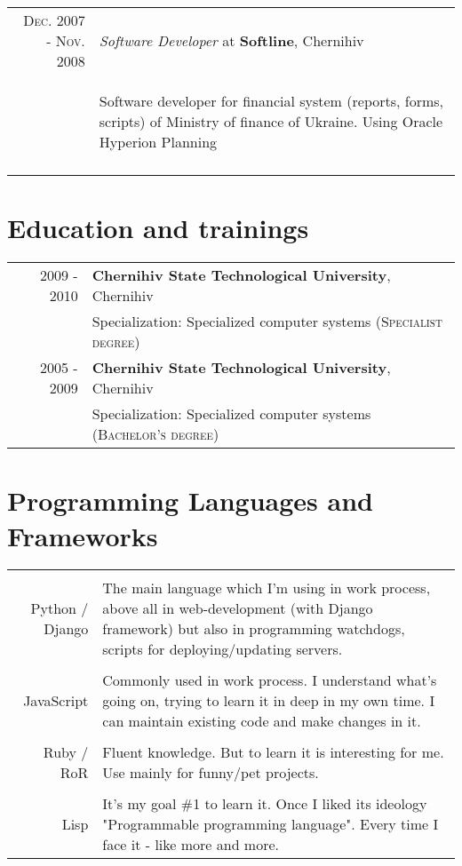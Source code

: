 \documentclass[a4paper,10pt]{article}
\begin{document}
\begin{tabular}{rp{11cm}}
  \textsc{Dec. 2007 - Nov. 2008} & \emph{Software Developer} at \textbf{Softline}, Chernihiv\\ 
  & \begin{compactitem} 
    \item Software developer for financial system (reports, forms, scripts) of Ministry of finance of Ukraine. Using Oracle Hyperion Planning
    \end{compactitem}\vspace{-1em} \\
\multicolumn{2}{c}{} \\

\end{tabular}

\section{Education and trainings}
\begin{tabular}{rl}
2009 - 2010 & \textbf{Chernihiv State Technological University}, Chernihiv \\
 & Specialization: Specialized computer systems (\textsc{Specialist degree}) \\

2005 - 2009 & \textbf{Chernihiv State Technological University}, Chernihiv \\
 & Specialization: Specialized computer systems (\textsc{Bachelor's degree}) \\
\end{tabular}

\section{Programming Languages and Frameworks}
 \begin{tabular}{r|p{11cm}}
 \multicolumn{2}{c}{} \\
  Python / Django & The main language which I'm using in work process, above all in web-development (with Django framework) but also in programming watchdogs, scripts for deploying/updating servers.\\
 \multicolumn{2}{c}{} \\
  JavaScript & Commonly used in work process. I understand what's going on, trying to learn it in deep in my own time. I can maintain existing code and make changes in it.   \\
 \multicolumn{2}{c}{} \\
  Ruby / RoR & Fluent knowledge. But to learn it is interesting for me. Use mainly for funny/pet projects. \\
 \multicolumn{2}{c}{} \\
  Lisp & It's my goal \#1 to learn it. Once I liked its ideology "Programmable programming language". Every time I face it - like more and more. \\
 \end{tabular}
\end{document}
